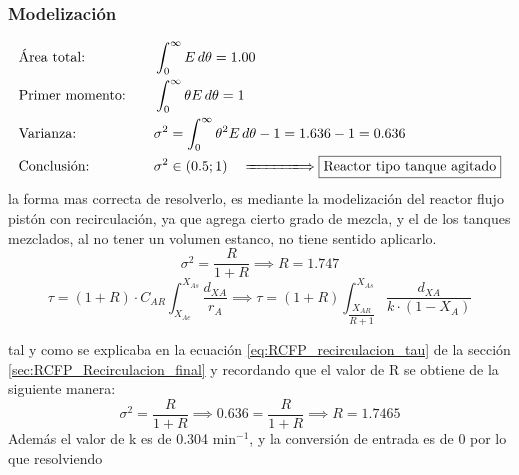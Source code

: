 \subsubsection{Modelización}
\begin{alignat*}{2}
     & \text{Área total:}           &  & \int_{0}^{\infty} E \, d\theta = 1.00                                                                  \\
     & \text{Primer momento:} \quad &  & \int_{0}^{\infty} \theta E \, d\theta = 1                                                              \\
     & \text{Varianza:}             &  & \sigma^2 = \int_{0}^{\infty} \theta^2 E \, d\theta - 1 = 1.636 - 1 = 0.636                             \\
     & \text{Conclusión:}           &  & \sigma^2 \in (0.5; 1)\quad \xLongrightarrow{\hspace{1.4cm}} \boxed{\text{Reactor tipo tanque agitado}}
\end{alignat*}
\noindent la forma mas correcta de resolverlo, es mediante la modelización del reactor flujo pistón con recirculación, ya que agrega cierto grado de mezcla, y el de los tanques mezclados, al no tener un volumen estanco, no tiene sentido aplicarlo.
\begin{equation}
    \sigma^2 = \frac{R}{1+R} \implies R = 1.747
\end{equation}
\begin{equation}
    \tau = (1+R) \cdot C_{AR} \int_{X_{Ae}}^{X_{As}} \frac{d_{XA}}{r_A} \implies \tau = (1+R) \int_{\dfrac{X_{AR}}{R+1}}^{X_{As}} \frac{d_{XA}}{k\cdot (1-X_A)}
\end{equation}

\noindent tal y como se explicaba en la ecuación \ref{eq:RCFP_recirculacion_tau} de la sección \ref{sec:RCFP_Recirculacion_final} y recordando que el valor de R se obtiene de la siguiente manera:
\begin{equation}
    \sigma^2 = \frac{R}{1+R} \implies 0.636 = \frac{R}{1+R} \implies R = 1.7465
\end{equation}
\noindent Además el valor de k es de 0.304 min$^{-1}$, y la conversión de entrada es de 0 por lo que resolviendo\\

\begin{center}
\end{center}


